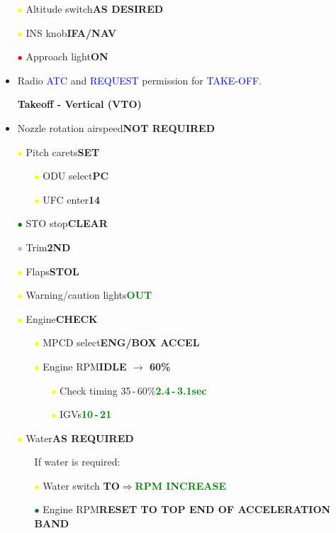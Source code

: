 \documentclass[a4paper,12pt,dvipsnames]{letter}
\newcommand{\radio}[1]{\textcolor{blue}{#1}}
\newcommand{\button}[1]{\textbf{#1}}
\newcommand{\Deg}{\textdegree{}}
\newcommand{\ok}[1]{\textcolor{Green}{\textbf{#1}}}
\newcommand{\ri}{\textcolor{Red}{$\bullet$\;}}
\newcommand{\gi}{\textcolor{Green}{$\bullet$\;}}
\newcommand{\yi}{\textcolor{Yellow}{$\bullet$\;}}
\newcommand{\vi}{\textcolor{Plum}{$\bullet$\;}}
\begin{document}
{\begin{itemize}
\item[\yi] Altitude switch\dotfill\button{AS DESIRED}
\item[\yi] INS knob\dotfill\button{IFA/NAV}
\item[\ri] Approach light\dotfill\button{ON}
\item Radio \radio{ATC} and \radio{REQUEST} permission for \radio{TAKE-OFF}.
\end{itemize}
\newpage
\begin{itemize}
\item[] {\LARGE\textbf{Takeoff - Vertical (VTO)}}
\item Nozzle rotation airspeed\dotfill\button{NOT REQUIRED}
\item[\yi] Pitch carets\dotfill\button{SET}
\begin{itemize}
 \item[\yi] ODU select\dotfill\button{PC}
 \item[\yi] UFC enter\dotfill\button{14}
\end{itemize}
\item[\gi] STO stop\dotfill\button{CLEAR}
\item[\vi] Trim\dotfill\button{2\Deg\;ND}
\item[\yi] Flaps\dotfill\button{STOL}
\item[\yi] Warning/caution lights\dotfill\ok{OUT}
\item[\yi] Engine\dotfill\button{CHECK}
\begin{itemize}
 \item[\yi] MPCD select\dotfill\button{ENG/BOX ACCEL}
 \item[\yi] Engine RPM\dotfill\button{IDLE $\rightarrow$ 60\%}
 \begin{itemize}
  \item[\yi] Check timing 35\,-\,60\%\dotfill\ok{2.4\,-\,3.1\;sec}
  \item[\yi] IGVs\dotfill\ok{10\Deg\,-\,21\Deg}	
 \end{itemize}
\end{itemize}
\item[\yi] Water\dotfill\button{AS REQUIRED}
\begin{itemize}
 \item[] If water is required:
 \item[\yi] Water switch \dotfill\button{TO}\;$\Rightarrow$\;\ok{RPM INCREASE}
 \item[\gi] Engine RPM\dotfill\button{RESET TO TOP END OF ACCELERATION BAND}

\end{itemize}
\end{itemize}}
\end{document}
